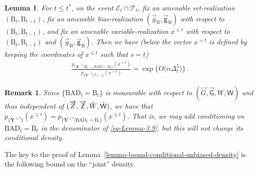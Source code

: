 \documentclass[11pt]{article}
\newtheorem{Lemma}[Theorem]{Lemma}
\newtheorem{Remark}[Theorem]{Remark}
\numberwithin{equation}{section}
\begin{document}
\begin{Lemma} {\label{lemma-bound-conditional-unbiased-density}}
For $t \leq t^*$, on the event $\mathcal{E}_{t} \cap \mathcal{T}_{t}$, fix an amenable set-realization $(\mathrm{B}_t, \mathrm{B}_{t-1})$, fix an amenable bias-realization $(\overrightarrow{g}_{\mathrm{B}}, \overrightarrow{\mathsf{g}}_{\mathrm{B}})$ with respect to $(\mathrm{B}_t,\mathrm{B}_{t-1})$, and fix an amenable variable-realization $x^{\leq t}$ with respect to $(\mathrm{B}_t,\mathrm{B}_{t-1})$ and $(\overrightarrow{g}_{\mathrm{B}}, \overrightarrow{\mathsf{g}}_{\mathrm{B}})$. Then we have (below the vector $x^{=t}$ is defined by keeping the coordinates of $x^{\leq t}$ such that $s=t$)
\begin{align} \label{eq-Lemma-3.9}
    \frac{  p_{ \{ \mathbf{X}^{=t} | \mathfrak{S}_{t-1}; \mathrm{BAD}_t = \mathrm{B}_t \} } ( x^{=t} ) }{ p_{ \{ \mathbf{Y}^{=t} |  \mathcal{F}_{t-1} \} } ( x^{=t} ) } = \exp \big\{ O \big( n \Delta_t^5 \big) \big\} \,.
\end{align}
\end{Lemma}
\begin{Remark}\label{rem-Y-conditioning-B-t}
Since $\{ \mathrm{BAD}_t = \mathrm{B}_t \}$ is measurable with respect to $( \overrightarrow{G}, \overrightarrow{\mathsf{G}}, W, \mathsf{W} )$ and thus independent of $(\overrightarrow{Z}, \overrightarrow{\mathsf{Z}}, \Tilde{W}, \Tilde{\mathsf{W}})$, we have that ${p}_{ \{ \mathbf{Y}^{\leq t} \} } (x^{\leq t}) ={p}_{ \{ \mathbf{Y}^{\leq t} | \mathrm{BAD}_t = \mathrm{B}_t \} } (x^{\leq t})$. That is, we may add conditioning on $\mathrm{BAD}_{t} = \mathrm{B}_t$ in the denominator of \eqref{eq-Lemma-3.9}, but this will not change its conditional density.
\end{Remark}
The key to the proof of Lemma~\ref{lemma-bound-conditional-unbiased-density} is the following bound on the ``joint'' density. 
\end{document}
